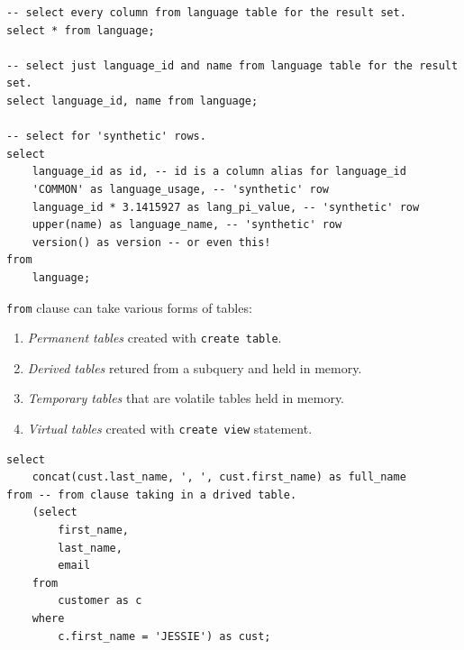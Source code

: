 \documentclass[a4paper]{article}
\begin{document}
\begin{lstlisting}
-- select every column from language table for the result set.
select * from language;

-- select just language_id and name from language table for the result set.
select language_id, name from language;

-- select for 'synthetic' rows.
select 
    language_id as id, -- id is a column alias for language_id
    'COMMON' as language_usage, -- 'synthetic' row
    language_id * 3.1415927 as lang_pi_value, -- 'synthetic' row
    upper(name) as language_name, -- 'synthetic' row
    version() as version -- or even this!
from 
    language;
\end{lstlisting}

\flushleft\lstinline{from} clause can take various forms of tables:

\begin{enumerate}
    \item \emph{Permanent tables} created with \lstinline{create table}.
    \item \emph{Derived tables} retured from a subquery and held in memory.
    \item \emph{Temporary tables} that are volatile tables held in memory.
    \item \emph{Virtual tables} created with \lstinline{create view} statement.
\end{enumerate}

\begin{lstlisting}
select
    concat(cust.last_name, ', ', cust.first_name) as full_name
from -- from clause taking in a drived table.
    (select
        first_name,
        last_name,
        email
    from
        customer as c
    where
        c.first_name = 'JESSIE') as cust;
\end{lstlisting}
\end{document}
